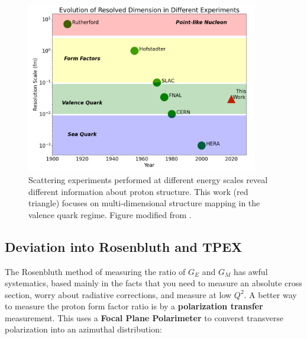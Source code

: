         \begin{figure}
            \centering
            \includegraphics[width=0.9\textwidth]{Chapters/Ch1-Intro/Ch1-Sec1-Background/pics/experiment_scales.png}
            \caption[Scattering Measurements at Different Scales]{Scattering experiments performed at different energy scales reveal different information about proton structure. This work (red triangle) focuses on multi-dimensional structure mapping in the valence quark regime. Figure modified from \parencite{Klein2005ResolvingHERA}.}
            \label{fig:experimentsVsscale}
        \end{figure}






\iffalse
       \subsection{Deviation into Rosenbluth and TPEX}
        
                
            The Rosenbluth method of measuring the ratio of $G_E$ and $G_M$ has awful systematics, based mainly in the facts that you need to measure an absolute cross section, worry about radiative corrections, and measure at low $Q^2$. A better way to measure the proton form factor ratio is by a \textbf{polarization transfer} measurement. This uses a \textbf{Focal Plane Polarimeter} to converst transverse polarization into an azimuthal distribution:
            
